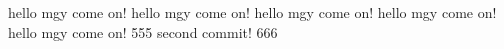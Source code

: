 hello mgy  come on!
hello mgy  come on!
hello mgy  come on!
hello mgy  come on!
hello mgy  come on! 555
second commit!  666
